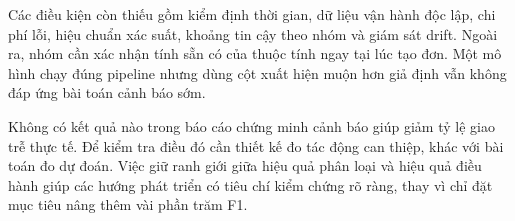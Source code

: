 Các điều kiện còn thiếu gồm kiểm định thời gian, dữ liệu vận hành độc
lập, chi phí lỗi, hiệu chuẩn xác suất, khoảng tin cậy theo nhóm và giám
sát drift. Ngoài ra, nhóm cần xác nhận tính sẵn có của thuộc tính ngay
tại lúc tạo đơn. Một mô hình chạy đúng pipeline nhưng dùng cột xuất hiện
muộn hơn giả định vẫn không đáp ứng bài toán cảnh báo sớm.

Không có kết quả nào trong báo cáo chứng minh cảnh báo giúp giảm tỷ lệ
giao trễ thực tế. Để kiểm tra điều đó cần thiết kế đo tác động can thiệp,
khác với bài toán đo dự đoán. Việc giữ ranh giới giữa hiệu quả phân loại
và hiệu quả điều hành giúp các hướng phát triển có tiêu chí kiểm chứng
rõ ràng, thay vì chỉ đặt mục tiêu nâng thêm vài phần trăm F1.
